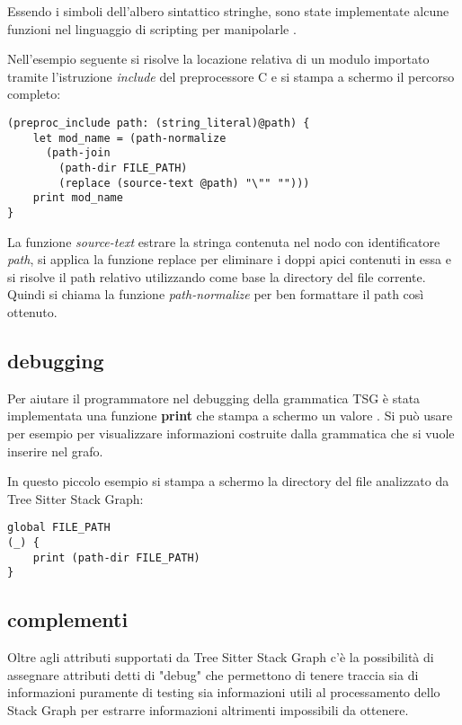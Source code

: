 Essendo i simboli dell'albero sintattico stringhe, sono state implementate alcune funzioni nel linguaggio di scripting per manipolarle \cite{TreeSitterGraphReferenceFunctions} \cite{TreeSitterStackGraphPaths}.

Nell'esempio seguente si risolve la locazione relativa di un modulo importato tramite l'istruzione \emph{include} del preprocessore C e si stampa a schermo il percorso completo:

\begin{lstlisting}
(preproc_include path: (string_literal)@path) {
    let mod_name = (path-normalize
      (path-join
        (path-dir FILE_PATH)
        (replace (source-text @path) "\"" "")))
    print mod_name
}
\end{lstlisting}

La funzione \emph{source-text} estrare la stringa contenuta nel nodo con identificatore \emph{path}, si applica la funzione replace per eliminare i doppi apici contenuti in essa e si risolve il path relativo utilizzando come base la directory del file corrente.
Quindi si chiama la funzione \emph{path-normalize} per ben formattare il path cos\`i ottenuto.

\subsection{debugging}

Per aiutare il programmatore nel debugging della grammatica TSG \`e stata implementata una funzione \textbf{print} che stampa a schermo un valore \cite{TreeSitterGraphReferenceDebugging}.
Si pu\`o usare per esempio per visualizzare informazioni costruite dalla grammatica che si vuole inserire nel grafo.

In questo piccolo esempio si stampa a schermo la directory del file analizzato da Tree Sitter Stack Graph:

\begin{lstlisting}
global FILE_PATH
(_) {
    print (path-dir FILE_PATH)
}
\end{lstlisting}

\subsection{complementi}

Oltre agli attributi supportati da Tree Sitter Stack Graph c'\`e la possibilit\`a di assegnare attributi detti di "debug" \cite{TreeSitterStackGraphDebugInfo} che permettono di tenere traccia sia di informazioni puramente di testing sia informazioni utili al processamento dello Stack Graph per estrarre informazioni altrimenti impossibili da ottenere.

